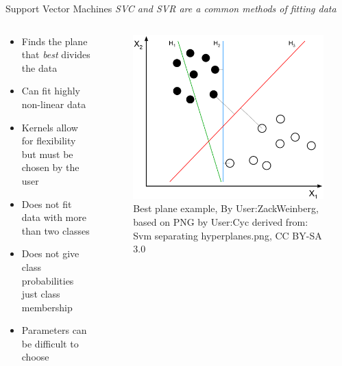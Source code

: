 \documentclass[10pt]{beamer}
\begin{document}
\begin{frame}{Support Vector Machines}
\emph{SVC and SVR are a common methods of fitting data}
	\begin{columns}
	\begin{column}{0.5\textwidth}
	\begin{itemize}
		\item Finds the plane that \emph{best} divides the data
		\item Can fit highly non-linear data
		\item Kernels allow for flexibility but must be chosen by the user
		\item Does not fit data with more than two classes
		\item Does not give class probabilities just class membership
		\item Parameters can be difficult to choose
	\end{itemize}
	\end{column}
	\begin{column}{0.5\textwidth}
		\begin{figure}	
			\caption{Best plane example, {\tiny By User:ZackWeinberg, based on PNG by User:Cyc derived from: Svm separating hyperplanes.png, CC BY-SA 3.0}}
			\includegraphics[width=1.0\textwidth, center, trim=0cm 0cm 0 0cm]{images/Svm_separating_hyperplanes.pdf}
	\end{figure}
	\end{column}
	\end{columns}
\end{frame}
\end{document}
